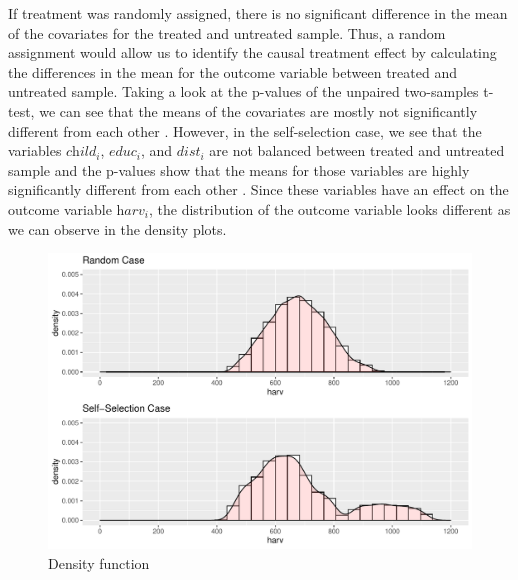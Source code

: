 \begin{enumerate}
If treatment was randomly assigned, there is no significant difference in the mean of the covariates for the treated and untreated sample. Thus, a random assignment would allow us to identify the causal treatment effect by calculating the differences in the mean for the outcome variable between treated and untreated sample. Taking a look at the p-values of the  unpaired two-samples t-test, we can see that the means of the covariates are mostly not significantly different from each other . However, in the self-selection case, we see that the variables $\textit{child}_i$, $\textit{educ}_i$, and $\textit{dist}_i$ are not balanced between treated and untreated sample and the p-values show that the means for those variables are highly significantly different from each other . Since these variables have an effect on the outcome variable $\textit{harv}_i$, the distribution of the outcome variable looks different as we can observe in the density plots.

\begin{figure}[htb]
\begin{raggedleft}
\includegraphics[width=\linewidth]{../figures/density_total.pdf}
\caption{Density function}
\label{fig:density}
\end{raggedleft}
\end{figure}


\end{enumerate}
